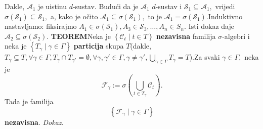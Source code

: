 \documentclass{article}
\begin{document}
\begin{enumerate}
\end{enumerate}  Dakle, \(\mathcal A_1\) je uistinu \(d\)-sustav. Budući da je \(\mathcal A_1\) \(d\)-sustav i \(\mathcal S_1\subseteq\mathcal A_1,\) vrijedi \(\sigma\left(\mathcal S_1\right)\subseteq\mathcal S_1,\) a, kako je očito \(\mathcal A_1\subseteq\sigma\left(\mathcal S_1\right),\) to je \(\mathcal A_1=\sigma\left(\mathcal S_1\right).\)\newline Induktivno nastavljamo: fiksirajmo \(A_1\in\sigma\left(\mathcal S_1\right),A_3\in\mathcal S_3,\ldots,A_n\in S_n.\) Isti dokaz daje \(\mathcal A_2\subseteq\sigma\left(\mathcal S_2\right).\)\newline\newline
\textbf{TEOREM}\newline Neka je \(\left\{\mathcal C_t\mid t\in T\right\}\) \textbf{nezavisna} familija \(\sigma\)-algebri i neka je \(\left\{T_\gamma\mid\gamma\in\Gamma\right\}\) \textbf{particija} skupa \(T\)\newline (dakle, \(T_\gamma\subseteq T,\forall \gamma\in\Gamma,T_\gamma\cap T_{\gamma'}=\emptyset,\forall \gamma,\gamma'\in\Gamma,\gamma\ne\gamma',\bigcup_{\gamma\in\Gamma}T_\gamma=T\)).\newline Za svaki \(\gamma\in\Gamma,\) neka je \[\mathcal F_\gamma:=\sigma\left(\bigcup_{t\in T_\gamma}\mathcal C_t\right).\]  Tada je familija \[\left\{\mathcal F_\gamma\mid\gamma\in\Gamma\right\}\] \textbf{nezavisna}.\newline\newline
\textit{Dokaz.}\newline
\end{document}
